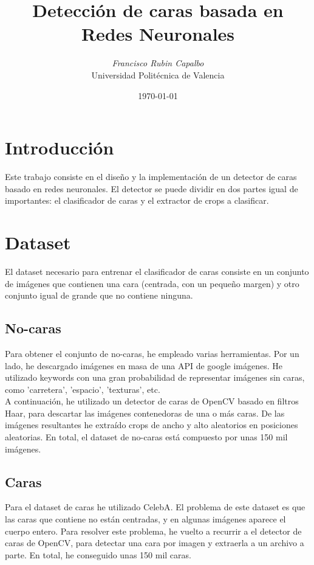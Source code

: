 \documentclass[a4paper, 11pt]{article}
\title{\Large{\textbf{Detección de caras basada en Redes Neuronales}}}
\author{\textit{Francisco Rubin Capalbo}\\
		Universidad Politécnica de Valencia }
\date{\today}
\begin{document}
    
    \maketitle
    \section{Introducción}
    	Este trabajo consiste en el diseño y la implementación de un detector de caras basado en redes neuronales. El detector se puede dividir en dos partes igual de importantes: el clasificador de caras y el extractor de crops a clasificar. \\
    \section{Dataset}
		El dataset necesario para entrenar el clasificador de caras consiste en un conjunto de imágenes que contienen una cara (centrada, con un pequeño margen) y otro conjunto igual de grande que no contiene ninguna. 
		
		\subsection{No-caras}
		Para obtener el conjunto de no-caras\cite{script-no-caras}, he empleado varias herramientas. Por un lado, he descargado imágenes en masa de una API de google imágenes. He utilizado keywords con una gran probabilidad de representar imágenes sin caras, como 'carretera', 'espacio', 'texturas', etc. \\
		
		 A continuación, he utilizado un detector de caras de OpenCV basado en filtros Haar, para descartar las imágenes contenedoras de una o más caras. De las imágenes resultantes he extraído crops de ancho y alto aleatorios en posiciones aleatorias. En total, el dataset de no-caras está compuesto por unas 150 mil imágenes. 
		 
		 \subsection{Caras}
		 Para el dataset de caras he utilizado CelebA\cite{celeb-a}. El problema de este dataset es que las caras que contiene no están centradas, y en algunas imágenes aparece el cuerpo entero. Para resolver este problema, he vuelto a recurrir a el detector de caras de OpenCV\cite{script-caras}, para detectar una cara por imagen y extraerla a un archivo a parte. En total, he conseguido unas 150 mil caras. 
\end{document}
